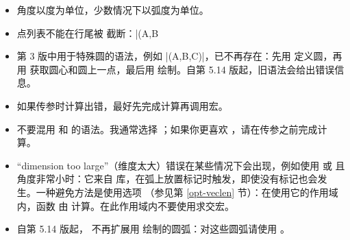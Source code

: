 \begin{itemize}
  \item 角度以度为单位，少数情况下以弧度为单位。

  \item 点列表不能在行尾被 \code{\%} 截断：|\tkzDrawSegments(A,B%

  \item 第 3 版中用于特殊圆的语法，例如 |\tkzDrawCircle[euler](A,B,C)|，已不再存在：先用  定义圆，再用  获取圆心和圆上一点，最后用  绘制。自第 5.14 版起，旧语法会给出错误信息。

  \item 如果传参时计算出错，最好先完成计算再调用宏。

  \item 不要混用  和  的语法。我通常选择 ；如果你更喜欢 ，请在传参之前完成计算。

  \item ``dimension too large''（维度太大）错误在某些情况下会出现，例如使用  或  且角度非常小时：它来自  库，在弧上放置标记时触发，即使没有标记也会发生。一种避免方法是使用选项 （参见第 \ref{opt-veclen} 节）：在使用它的作用域内，函数  由  计算。在此作用域内不要使用求交宏。

  \item 自第 5.14 版起，\code{[delta=...]} 不再扩展用  绘制的圆弧：对这些圆弧请使用 \code{[delta=...]}。
\end{itemize}
\endinput

